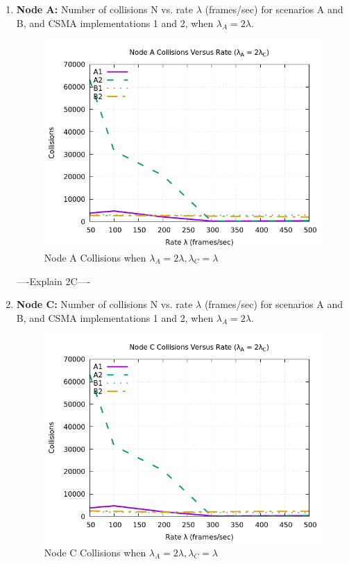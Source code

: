 \documentclass[12pt]{article}
\begin{document}
\begin{enumerate}
{            ----Explain 2B----
        }    
\clearpage  
        \item {
            {\bf Node A:} Number of collisions N vs. rate \(\lambda{}\) (frames/sec) for scenarios A and B, and CSMA implementations 1 and 2, when \(\lambda{}_A = 2\lambda{}\).
            
            \begin{figure}[!htb]
                \centering
                \includegraphics[width=5in]{2C.png}
                \caption{Node A Collisions when \(\lambda{}_A = 2\lambda{}, \lambda{}_C = \lambda{}\) }
                \label{fig:2C}
            \end{figure}

            ----Explain 2C----
        }        
    
\clearpage  
        \item {
            {\bf Node C:} Number of collisions N vs. rate \(\lambda{}\) (frames/sec) for scenarios A and B, and CSMA implementations 1 and 2, when \(\lambda{}_A = 2\lambda{}\).
            
            \begin{figure}[!htb]
                \centering
                \includegraphics[width=5in]{2D.png}
                \caption{Node C Collisions when \(\lambda{}_A = 2\lambda{}, \lambda{}_C = \lambda{}\) }
                \label{fig:2D}
            \end{figure}

}
\end{enumerate}
\end{document}

